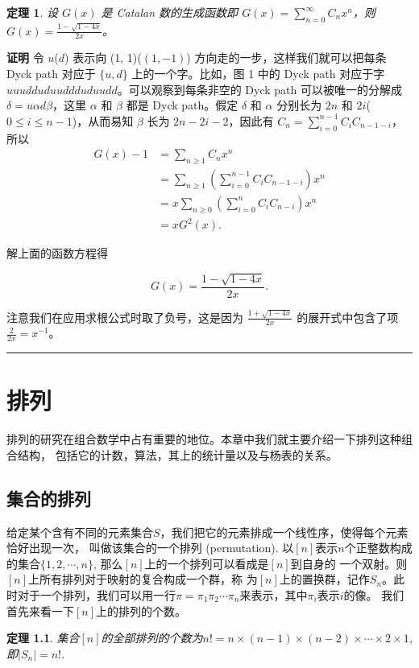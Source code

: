 \documentclass[a4paper,11pt,twoside]{book}
\newtheorem{thm}{定理}[section]
\def\qed{\nopagebreak\hfill{\rule{4pt}{7pt}}\medbreak}
\begin{document}
\begin{thm}
设 $G(x)$ 是 Catalan 数的生成函数即
$G(x)=\sum\limits_{n=0}^{\infty}C_nx^n$，则
$G(x)=\frac{1-\sqrt{1-4x}}{2x}$。
\end{thm}
{\bf{证明}} 令 $u$($d$) 表示向 (1, 1)($(1,-1)$)
方向走的一步，这样我们就可以把每条 Dyck path 对应于 $\{u, d\}$
上的一个字。比如，图 1 中的 Dyck path 对应于字
$uuudduduuddduduudd$。可以观察到每条非空的 Dyck path
可以被唯一的分解成 $\delta=u\alpha d\beta$，这里 $\alpha$ 和 $\beta$
都是 Dyck path。假定 $\delta$ 和 $\alpha$ 分别长为 $2n$ 和
$2i$($0\le i\le n-1$)，从而易知 $\beta$ 长为 $2n-2i-2$，因此有
$C_n=\sum\limits_{i=0}^{n-1}C_iC_{n-1-i}$，所以
\begin{align*}
G(x)-1%
&=\sum_{n\ge1}C_nx^n\\
&=\sum_{n\ge1}\left(\sum_{i=0}^{n-1}C_iC_{n-1-i}\right)x^n\\%
&=x\sum_{n\ge0}\left(\sum_{i=0}^{n}C_iC_{n-i}\right)x^{n}\\
&=xG^2(x).%
\end{align*}

解上面的函数方程得

\[
G(x)=\frac{1-\sqrt{1-4x}}{2x}.
\]

注意我们在应用求根公式时取了负号，这是因为
$\frac{1+\sqrt{1-4x}}{2x}$ 的展开式中包含了项
$\frac{2}{2x}=x^{-1}$。\qed






\chapter{排列}

排列的研究在组合数学中占有重要的地位。本章中我们就主要介绍一下排列这种组合结构，
包括它的计数，算法，其上的统计量以及与杨表的关系。

\section{集合的排列}%

给定某个含有不同的元素集合$S$，我们把它的元素排成一个线性序，使得每个元素恰好出现一次，
叫做该集合的一个排列 (permutation). 以$[n]$表示$n$个正整数构成的集合$\{1,2,\cdots,n\}$, 那么$[n]$上的一个排列可以看成是$[n]$到自身的
一个双射。则$[n]$上所有排列对于映射的复合构成一个群，称
为$[n]$上的置换群，记作$S_n$。此时对于一个排列，我们可以用一行$\pi=\pi_1\pi_2
\cdots \pi_n$来表示，其中$\pi_i$表示$i$的像。
我们首先来看一下$[n]$上的排列的个数。

\begin{thm}\label{perT1}
集合$[n]$的全部排列的个数为$n!=n\times (n-1) \times (n-2)\times \cdots \times 2\times 1$, 即$|S_n|=n!$.
\end{thm}
\end{document}
